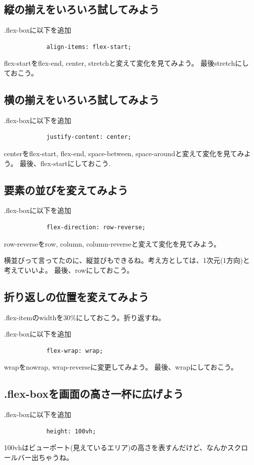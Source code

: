 \documentclass[mingoth,11pt,a4j,uplatex,dvipdfmx]{jsarticle}
\begin{document}
\subsection{縦の揃えをいろいろ試してみよう}
.flex-boxに以下を追加
\begin{lstlisting}
            align-items: flex-start;
\end{lstlisting}
flex-startをflex-end, center, stretchと変えて変化を見てみよう。
最後stretchにしておこう。

\subsection{横の揃えをいろいろ試してみよう}
.flex-boxに以下を追加
\begin{lstlisting}
            justify-content: center;
\end{lstlisting}
centerをflex-start, flex-end, space-between, space-aroundと変えて変化を見てみよう。
最後、flex-startにしておこう.


\subsection{要素の並びを変えてみよう}
.flex-boxに以下を追加
\begin{lstlisting}
            flex-direction: row-reverse;
\end{lstlisting}
row-reverseをrow, column, column-reverseと変えて変化を見てみよう。

横並びって言ってたのに、縦並びもできるね。考え方としては、1次元(1方向)と考えていいよ。
最後、rowにしておこう。

\subsection{折り返しの位置を変えてみよう}
.flex-itemのwidthを30\%にしておこう。折り返すね。

.flex-boxに以下を追加
\begin{lstlisting}
            flex-wrap: wrap;
\end{lstlisting}
wrapをnowrap, wrap-reverseに変更してみよう。
最後、wrapにしておこう。

\subsection{.flex-boxを画面の高さ一杯に広げよう}
.flex-boxに以下を追加
\begin{lstlisting}
            height: 100vh;
\end{lstlisting}
100vhはビューポート(見えているエリア)の高さを表すんだけど、なんかスクロールバー出ちゃうね。
\end{document}
